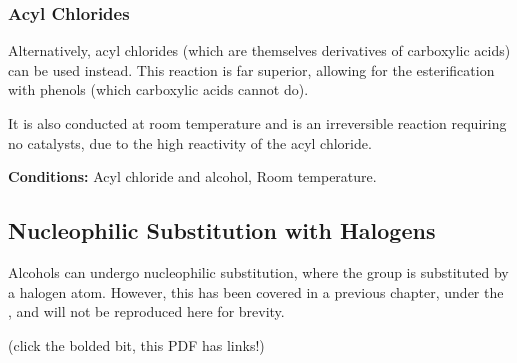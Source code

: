 
			\subsubsection{Acyl Chlorides}

				Alternatively, acyl chlorides (which are themselves derivatives of carboxylic acids) can be used instead. This reaction
				is far superior, allowing for the esterification with phenols (which carboxylic acids cannot do).

				It is also conducted at room temperature and is an irreversible reaction requiring no catalysts, due to the high
				reactivity of the acyl chloride.

				\vspace{1.5em}
				\vbox{\textbf{Conditions:}	\tabto{35mm}Acyl chloride and alcohol,
											\tabto{35mm}Room temperature.}







		\subsection{Nucleophilic Substitution with Halogens}

			Alcohols can undergo nucleophilic substitution, where the  group is substituted by a halogen atom. However, this
			has been covered in a previous chapter, under the \hyperlink{NSubAlcohols}{}, and will not
			be reproduced here for brevity.

			(click the bolded bit, this PDF has links!)


